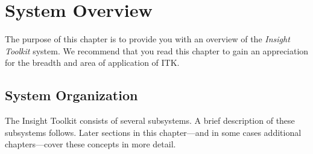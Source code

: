 \chapter{System Overview}
\label{chapter:SystemOverview}

The purpose of this chapter is to provide you with an overview of the
\emph{Insight Toolkit} system. We recommend that you read this chapter to
gain an appreciation for the breadth and area of application of ITK.

\section{System Organization}
\label{sec:SystemOrganization}

The Insight Toolkit consists of several subsystems. A brief
description of these subsystems follows. Later sections in this chapter---and
in some cases additional chapters---cover these concepts in more detail.

